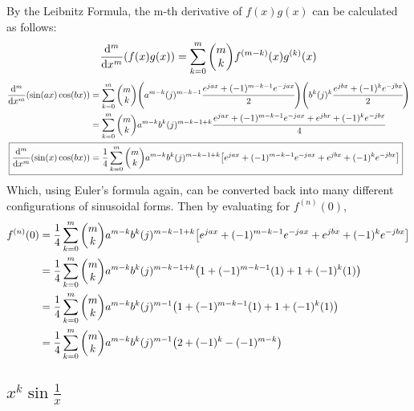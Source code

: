 \documentclass[]{article}
\begin{document}
By the Leibnitz Formula, the m-th derivative of $f(x) g(x)$ can be calculated as follows:
\[
    \dv[m]{x}\qty(f(x) g(x)) 
    = \sum_{k=0}^m \mqty(m \\ k) f^{(m-k)}(x) g^{(k)}(x)
\]
\begin{align*}
    \dv[m]{x}\qty(\sin(ax) \cos(bx)) 
        &= \sum_{k=0}^m \mqty(m \\ k) 
            \qty(a^{m - k} (j)^{m - k - 1} \cfrac{e^{j a x} + (-1)^{m - k - 1} e^{- j a x}}{2})
            \qty(b^k (j)^{k} \cfrac{e^{j b x} + (-1)^{k} e^{- j b x}}{2})\\
        &= \sum_{k=0}^m \mqty(m \\ k) 
            a^{m - k} b^{k} (j)^{m - k - 1 + k}
            \cfrac{e^{j a x} + (-1)^{m - k -1} e^{-j a x} + e^{j b x} + (-1)^{k} e^{-j b x}}{4}\\
    \Aboxed{
        \dv[m]{x} \qty(\sin(x) \cos(bx))
            &= \frac{1}{4} \sum_{k=0}^m \mqty(m \\ k) 
                a^{m - k} b^{k} (j)^{m - k - 1 + k}
                \qty[
                    e^{j a x} + (-1)^{m - k -1} e^{-j a x} + e^{j b x} + (-1)^{k} e^{-j b x}
                ]
    }
\end{align*}
Which, using Euler's formula again, can be converted back into many different configurations of sinusoidal forms.
Then by evaluating for $f^{(n)}(0)$,
\begin{align*}
    f^{(n)} (0) 
    &= \frac{1}{4} \sum_{k=0}^m \mqty(m \\ k) 
        a^{m - k} b^{k} (j)^{m - k - 1 + k}
        \qty[
            e^{j a x} + (-1)^{m - k -1} e^{-j a x} + e^{j b x} + (-1)^{k} e^{-j b x}
        ]\\
    &= \frac{1}{4} \sum_{k=0}^m \mqty(m \\ k) 
        a^{m - k} b^{k} (j)^{m - k - 1 + k}
        \qty(1 + (-1)^{m - k - 1} (1) + 1 + (-1)^{k} (1))\\
    &= \frac{1}{4} \sum_{k=0}^m \mqty(m \\ k) 
        a^{m - k} b^{k} (j)^{m - 1}
        \qty(1 + (-1)^{m - k - 1} (1) + 1 + (-1)^{k} (1))\\
    &= \frac{1}{4} \sum_{k=0}^m \mqty(m \\ k) 
        a^{m - k} b^{k} (j)^{m - 1} \qty(2 + (-1)^{k} - (-1)^{m - k})
\end{align*}
    

\subsection{
    $x^k \sin{\frac{1}{x}}$
}
\end{document}
